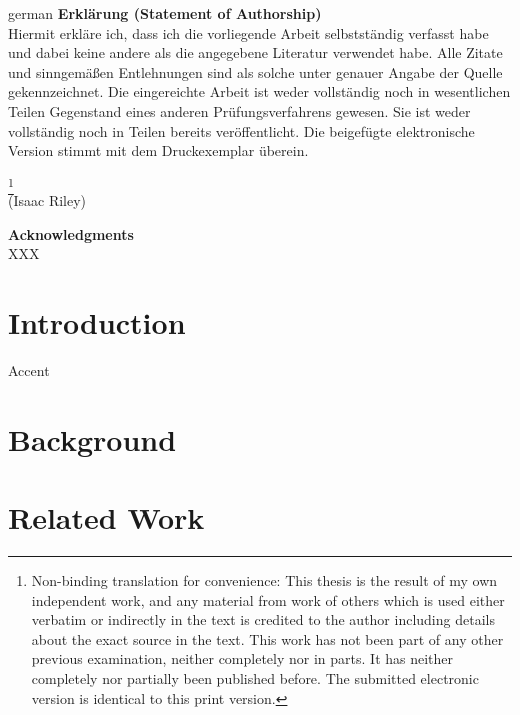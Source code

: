 \documentclass[12pt,leqno,a4paper]{article}
\begin{document}
\begin{otherlanguage}
{german}
\noindent\textbf{Erklärung (Statement of Authorship)}\\


\noindent Hiermit erkläre ich, dass ich die vorliegende Arbeit selbstständig verfasst habe und dabei keine andere als die angegebene Literatur verwendet habe. Alle Zitate und sinngemäßen Entlehnungen sind als solche unter genauer Angabe der Quelle gekennzeichnet. Die eingereichte Arbeit ist weder vollständig noch in wesentlichen Teilen Gegenstand eines anderen Prüfungsverfahrens gewesen. Sie ist weder vollständig noch in Teilen bereits veröffentlicht. Die beigefügte elektronische Version stimmt mit dem Druckexemplar überein.%
\end{otherlanguage}
\footnote{Non-binding translation for convenience: This thesis is the result of my own independent work, and any material from work of others which is used either verbatim or indirectly in the text is credited to the author including details about the exact source in the text. This work has not been part of any other previous examination, neither completely nor in parts. It has neither completely nor partially been published before. The submitted electronic version is identical to this print version.}\\[2cm]
\vspace{2cm}
(Isaac Riley)

\newpage
\thispagestyle{empty}
\noindent \textbf{Acknowledgments}\\
\noindent XXX

\newpage
\tableofcontents
\newpage

\section{Introduction}
Accent 

\section{Background}

\section{Related Work}
\end{document}
